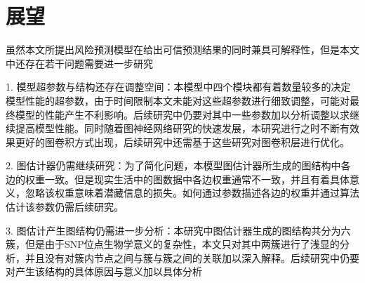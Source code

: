 \section{展望}

虽然本文所提出风险预测模型在给出可信预测结果的同时兼具可解释性，但是本文中还存在若干问题需要进一步研究

1. 模型超参数与结构还存在调整空间：本模型中四个模块都有着数量较多的决定模型性能的超参数，由于时间限制本文未能对这些超参数进行细致调整，可能对最终模型的性能产生不利影响。后续研究中仍要对其中一些参数加以分析调整以求继续提高模型性能。同时随着图神经网络研究的快速发展，本研究进行之时不断有效果更好的图卷积方式出现，后续研究中还需基于这些研究对图卷积层进行优化。

2. 图估计器仍需继续研究：为了简化问题，本模型图估计器所生成的图结构中各边的权重一致。但是现实生活中的图数据中各边权重通常不一致，并且有着具体意义，忽略该权重意味着潜藏信息的损失。如何通过参数描述各边的权重并通过算法估计该参数仍需后续研究。

3. 图估计产生图结构仍需进一步分析：本研究中图估计器生成的图结构共分为六簇，但是由于SNP位点生物学意义的复杂性，本文只对其中两簇进行了浅显的分析，并且没有对簇内节点之间与簇与簇之间的关联加以深入解释。后续研究中仍要对产生该结构的具体原因与意义加以具体分析
